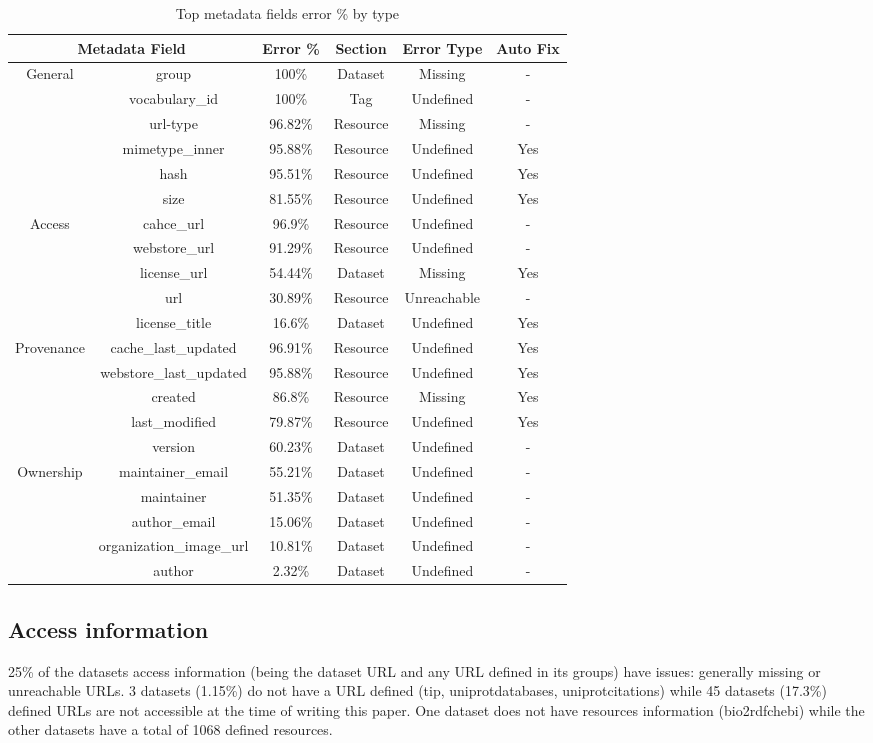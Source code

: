 \documentclass[runningheads,a4paper]{llncs}
\begin{document}
\begin{table}
 \begin{center}
 \begin{tabular}{|c|c|c|c|c|c|}
\hline
\multicolumn{2}{|c|}{Metadata Field} & Error \% & Section & Error Type & Auto Fix\tabularnewline
\hline
\hline
\multirow{6}{*}{General } & group & 100\% & Dataset & Missing & -\tabularnewline
\cline{2-6}
 & vocabulary\_id & 100\% & Tag & Undefined & -\tabularnewline
\cline{2-6}
 & url-type & 96.82\% & Resource & Missing & -\tabularnewline
\cline{2-6}
 & mimetype\_inner & 95.88\% & Resource & Undefined & Yes\tabularnewline
\cline{2-6}
 & hash & 95.51\% & Resource & Undefined & Yes\tabularnewline
\cline{2-6}
 & size & 81.55\% & Resource & Undefined & Yes\tabularnewline
\hline
\multirow{5}{*}{Access } & cahce\_url & 96.9\% & Resource & Undefined & -\tabularnewline
\cline{2-6}
 & webstore\_url & 91.29\% & Resource & Undefined & -\tabularnewline
\cline{2-6}
 & license\_url & 54.44\% & Dataset & Missing & Yes\tabularnewline
\cline{2-6}
 & url & 30.89\% & Resource & Unreachable & -\tabularnewline
\cline{2-6}
 & license\_title & 16.6\% & Dataset & Undefined & Yes\tabularnewline
\hline
\multirow{5}{*}{Provenance } & cache\_last\_updated & 96.91\% & Resource & Undefined & Yes\tabularnewline
\cline{2-6}
 & webstore\_last\_updated & 95.88\% & Resource & Undefined & Yes\tabularnewline
\cline{2-6}
 & created & 86.8\% & Resource & Missing & Yes\tabularnewline
\cline{2-6}
 & last\_modified & 79.87\% & Resource & Undefined & Yes\tabularnewline
\cline{2-6}
 & version & 60.23\% & Dataset & Undefined & -\tabularnewline
\hline
\multirow{5}{*}{Ownership } & maintainer\_email & 55.21\% & Dataset & Undefined & -\tabularnewline
\cline{2-6}
 & maintainer & 51.35\% & Dataset & Undefined & -\tabularnewline
\cline{2-6}
 & author\_email & 15.06\% & Dataset & Undefined & -\tabularnewline
\cline{2-6}
 & organization\_image\_url & 10.81\% & Dataset & Undefined & -\tabularnewline
\cline{2-6}
 & author & 2.32\% & Dataset & Undefined & -\tabularnewline
\hline
\end{tabular}
 \caption{Top metadata fields error \% by type} 
 \label{tab:main}
 \end{center}
\end{table}

\subsection{Access information}
25\% of the datasets access information (being the dataset URL and any URL defined in its groups) have issues: generally missing or unreachable URLs. 3 datasets (1.15\%) do not have a URL defined (tip, uniprot\-databases, uniprot\-citations) while 45 datasets (17.3\%) defined URLs are not accessible at the time of writing this paper. One dataset does not have resources information (bio2rdf\-chebi) while the other datasets have a total of 1068 defined resources.
\end{document}
